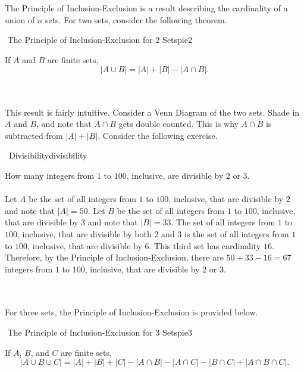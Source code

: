         The Principle of Inclusion-Exclusion is a result describing the cardinality of a union of \(n\) sets. For two sets, consider the following theorem.
        \begin{theorem}{\Stop\,\,The Principle of Inclusion-Exclusion for \(2\) Sets}{pie2}
        
            If \(A\) and \(B\) are finite sets,
            \begin{equation*}
                |A\cup B|=|A|+|B|-|A\cap B|.
            \end{equation*}
        
        \end{theorem}
        \vphantom
        \\
        \\
        This result is fairly intuitive. Consider a Venn Diagram of the two sets. Shade in \(A\) and \(B\), and note that \(A\cap B\) gets double counted. This is why \(A\cap B\) is subtracted from \(|A|+|B|\). Consider the following exercise.
        \begin{exercise}{\Difficulty\,\Difficulty\,\,Divisibility}{divisibility}
        
            How many integers from \(1\) to \(100\), inclusive, are divisible by \(2\) or \(3\).
            \\
            \\
            Let \(A\) be the set of all integers from \(1\) to \(100\), inclusive, that are divisible by \(2\) and note that \(|A|=50\). Let \(B\) be the set of all integers from \(1\) to \(100\), inclusive, that are divisible by \(3\) and note that \(|B|=33\). The set of all integers from \(1\) to \(100\), inclusive, that are divisible by both \(2\) and \(3\) is the set of all integers from \(1\) to \(100\), inclusive, that are divisible by \(6\). This third set has cardinality \(16\). Therefore, by the Principle of Inclusion-Exclusion, there are \(50+33-16=67\) integers from \(1\) to \(100\), inclusive, that are divisible by \(2\) or \(3\).
        
        \end{exercise}
        \vphantom
        \\
        \\
        For three sets, the Principle of Inclusion-Exclusion is provided below.
        \begin{theorem}{\Stop\,\,The Principle of Inclusion-Exclusion for \(3\) Sets}{pie3}
        
            If \(A\), \(B\), and \(C\) are finite sets,
            \begin{equation*}
                |A\cup B\cup C|=|A|+|B|+|C|-|A\cap B|-|A\cap C|-|B\cap C|+|A\cap B\cap C|.
            \end{equation*}
        
        \end{theorem}
        
